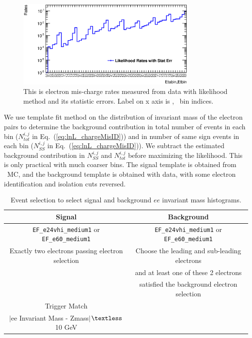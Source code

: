\begin{figure}[htp]
\centering
\includegraphics[width=0.8\textwidth]{figures/ChargeMisID/Egamma_LL.eps}
\caption{This is electron mis-charge rates measured from data with likelihood method and its statistic errors. Label on x axis is \eta, \pt\ bin indices.}
\label{fig:LL_Rates_Egamma}
\end{figure}

We use template fit method on the distribution of invariant mass of
the electron pairs to determine the background contribution in total
number of events in each bin ($N^{i,j}_{tot}$ in
Eq.~(\ref{eq:lnL_chargeMisID})) and in number of same sign events in each
bin ($N^{i,j}_{SS}$ in Eq.~(\ref{eq:lnL_chargeMisID})).  We subtract the
estimated background contribution in $N^{i,j}_{SS}$ and
$N^{i,j}_{tot}$ before maximizing the likelihood. This is only
practical with much coarser bins. The signal template is obtained from
\Zee\ MC, and the background template is obtained with data, with some
electron identification and isolation cuts reversed.

\begin{table}
  \centering
  \begin{tabular}{|c|c|}
  \hline
  Signal & Background \\
  \hline
  \texttt{EF\_e24vhi\_medium1} or \texttt{EF\_e60\_medium1} & \texttt{EF\_e24vhi\_medium1} or \texttt{EF\_e60\_medium1} \\
  \hline
  Exactly two electrons passing electron selection & Choose the leading and sub-leading electrons \\ & and at least one of these 2 electrons \\ & satisfied the background electron selection \\
  \hline
  Trigger Match & \\
  \hline
  $|$ee Invariant Mass - Zmass$|$$\textless$10 GeV & \\
  \hline
  \end{tabular}
\caption{Event selection to select signal and background $ee$ invariant mass histograms.}
\label{tab:Event_Selection}
\end{table}

